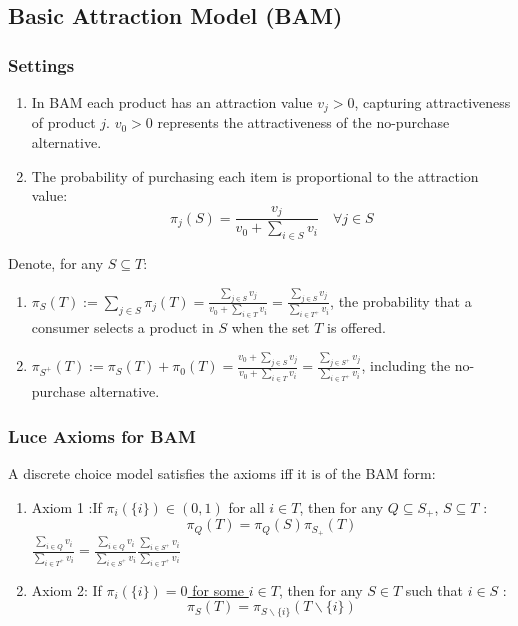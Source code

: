 \documentclass[11pt,a4paper]{article}
\begin{document}
\subsection{Basic Attraction Model (BAM)}
\subsubsection{Settings}
\begin{enumerate}[$\bullet$]
    \item In BAM each product has an attraction value $v_j > 0$, capturing attractiveness of product $j$. $v_0>0$ represents the attractiveness of the no-purchase alternative.
    \item The probability of purchasing each item is proportional to the attraction value: $$\pi_j(S)=\frac{v_j}{v_0+\sum_{i\in S}v_i}\quad \forall j\in S$$
\end{enumerate}
Denote, for any $S \subseteq T$:
\begin{enumerate}[$\bullet$]
    \item $\pi_{S}(T):=\sum_{j \in S} \pi_{j}(T)=\frac{\sum_{j \in S}v_j}{v_0+\sum_{i\in T}v_i}=\frac{\sum_{j \in S}v_j}{\sum_{i\in T^+}v_i}$, the probability that a consumer selects a product in $S$ when the set $T$ is offered.
    \item $\pi_{S^{+}}(T):=\pi_{S}(T)+\pi_{0}(T)=\frac{v_0+\sum_{j \in S}v_j}{v_0+\sum_{i\in T}v_i}=\frac{\sum_{j \in S^+}v_j}{\sum_{i\in T^+}v_i}$, including the no-purchase alternative.
\end{enumerate}
\subsubsection{Luce Axioms for BAM}
A discrete choice model satisfies the axioms iff it is of the BAM form:
\begin{enumerate}[$\bullet$]
    \item Axiom 1 :If $\pi_{i}(\{i\}) \in(0,1)$ for all $i \in T$, then for any $Q \subseteq S_{+}$, $S \subseteq T$ :
    $$
    \pi_{Q}(T)=\pi_{Q}(S) \pi_{S_{+}}(T)
    $$
    $\frac{\sum_{i \in Q}v_i}{\sum_{i\in T^+}v_i}=\frac{\sum_{i \in Q}v_i}{\sum_{i\in S^+}v_i}\frac{\sum_{i \in S^+}v_i}{\sum_{i\in T^+}v_i}$
    \item Axiom 2: If \underline{$\pi_{i}(\{i\})=0$ for some $i \in T$}, then for any $S \in T$ such that $i \in S$ :
    $$
    \pi_{S}(T)=\pi_{S \backslash\{i\}}(T \backslash\{i\})
    $$
\end{enumerate}
\end{document}
